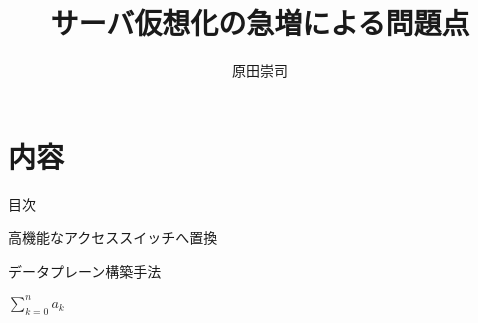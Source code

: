 \documentclass[14pt,mathserif,dvipdfmx,aspectratio=32]{beamer}
\title{サーバ仮想化の急増による問題点}
\author[氏名略称]{原田崇司}
\institute[所属略称]{神奈川大学大学院理学研究科 情報科学専攻 田中研究室}
\date{\empty}
\begin{document}
\begin{frame}
 \titlepage
\end{frame}
%
 \section*{内容}
 \begin{frame}{目次}
  \tableofcontents
 \end{frame}
%

\begin{frame}{高機能なアクセススイッチへ置換}



\end{frame}


\begin{frame}[plain]{データプレーン構築手法}

 \centering{
  
  }

$\sum^{n}_{k=0}a_{k}$

\end{frame}

%
%  
%  
%
\end{document}
